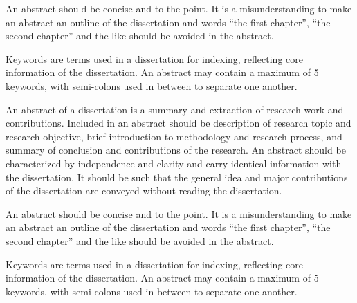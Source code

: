 An abstract should be concise and to the point. It is a misunderstanding to make an abstract an outline of the dissertation and words ``the first chapter'', ``the second chapter'' and the like should be avoided in the abstract.

Keywords are terms used in a dissertation for indexing, reflecting core information of the dissertation. An abstract may contain a maximum of 5 keywords, with semi-colons used in between to separate one another.

An abstract of a dissertation is a summary and extraction of research work and contributions. Included in an abstract should be description of research topic and research objective, brief introduction to methodology and research process, and summary of conclusion and contributions of the research. An abstract should be characterized by independence and clarity and carry identical information with the dissertation. It should be such that the general idea and major contributions of the dissertation are conveyed without reading the dissertation.

An abstract should be concise and to the point. It is a misunderstanding to make an abstract an outline of the dissertation and words ``the first chapter'', ``the second chapter'' and the like should be avoided in the abstract.

Keywords are terms used in a dissertation for indexing, reflecting core information of the dissertation. An abstract may contain a maximum of 5 keywords, with semi-colons used in between to separate one another.